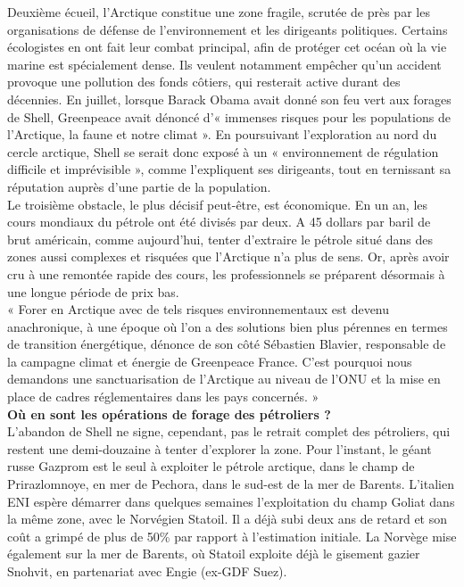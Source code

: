 \documentclass[8pt]{article}
\begin{document}
Deuxième écueil, l’Arctique constitue une zone fragile, scrutée de près par les organisations de défense de l’environnement et les dirigeants politiques. Certains écologistes en ont fait leur combat principal, afin de protéger cet océan où la vie marine est spécialement dense. Ils veulent notamment empêcher qu’un accident provoque une pollution des fonds côtiers, qui resterait active durant des décennies. En juillet, lorsque Barack Obama avait donné son feu vert aux forages de Shell, Greenpeace avait dénoncé d’« immenses risques pour les populations de l’Arctique, la faune et notre climat ». En poursuivant l’exploration au nord du cercle arctique, Shell se serait donc exposé à un « environnement de régulation difficile et imprévisible », comme l’expliquent ses dirigeants, tout en ternissant sa réputation auprès d’une partie de la population.\\

Le troisième obstacle, le plus décisif peut-être, est économique. En un an, les cours mondiaux du pétrole ont été divisés par deux. A 45 dollars par baril de brut américain, comme aujourd’hui, tenter d’extraire le pétrole situé dans des zones aussi complexes et risquées que l’Arctique n’a plus de sens. Or, après avoir cru à une remontée rapide des cours, les professionnels se préparent désormais à une longue période de prix bas.\\

« Forer en Arctique avec de tels risques environnementaux est devenu anachronique, à une époque où l’on a des solutions bien plus pérennes en termes de transition énergétique, dénonce de son côté Sébastien Blavier, responsable de la campagne climat et énergie de Greenpeace France. C’est pourquoi nous demandons une sanctuarisation de l’Arctique au niveau de l’ONU et la mise en place de cadres réglementaires dans les pays concernés. »\\

\textbf{Où en sont les opérations de forage des pétroliers ?}\\

L’abandon de Shell ne signe, cependant, pas le retrait complet des pétroliers, qui restent une demi-douzaine à tenter d’explorer la zone. Pour l’instant, le géant russe Gazprom est le seul à exploiter le pétrole arctique, dans le champ de Prirazlomnoye, en mer de Pechora, dans le sud-est de la mer de Barents. L’italien ENI espère démarrer dans quelques semaines l’exploitation du champ Goliat dans la même zone, avec le Norvégien Statoil. Il a déjà subi deux ans de retard et son coût a grimpé de plus de 50\% par rapport à l’estimation initiale. La Norvège mise également sur la mer de Barents, où Statoil exploite déjà le gisement gazier Snohvit, en partenariat avec Engie (ex-GDF Suez).\\
\end{document}
